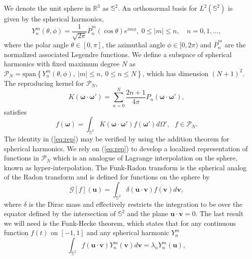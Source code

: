 \documentclass[landscape,a0b,final]{a0poster}
\newcommand{\HH}{{\mathcal P}}
\newcommand{\bomega}{{\boldsymbol{\omega}}}
\newcommand{\odotop}{{\boldsymbol{\omega}\cdot\boldsymbol{\omega}'}}
\newenvironment{poster}{
  \begin{center}
  \begin{minipage}[c]{0.98\textwidth}
}{
  \end{minipage} 
  \end{center}
}
\begin{document}
\begin{poster}
\begin{multicols}{3}
We denote the unit sphere in $\mathbb{R}^{3}$ as $\mathbb{S}^{2}$. An orthonormal basis for $L^{2}\left(\mathbb{S}^{2}\right)$ is given by the spherical harmonics, 
\begin{equation}
  Y_{n}^{m}\left(\theta,\phi\right)=\frac{1}{\sqrt{2\pi}}\overline{P}_{n}^{m}\left(\cos\theta\right)e^{im\phi},\;0\le|m|\le n,\quad n=0,1,\dots,
  \label{eq:ylm}
\end{equation}
%
where the polar angle $\theta\in[0,\pi]$, the azimuthal angle $\phi\in[0,2\pi)$
and $\overline{P}_{n}^{m}$ are the normalized associated Legendre functions. We define a subspace of spherical harmonics with fixed maximum degree $N$ as $\HH_{N}=\mathrm{span}\left\{ Y_{n}^{m}\left(\theta,\phi\right),\:|m|\le n,\:0\le n\le N\right\}$, which has dimension $\left(N+1\right)^{2}$. The reproducing kernel for $\HH_{N}$, 
%
\begin{equation}
  K\left(\bomega\cdot\bomega'\right) = \sum_{n=0}^{N}\frac{2n+1}{4\pi}P_{n}\left(\odotop\right),
  \label{eq:kernel}
\end{equation}
%
satisfies 
%
\begin{equation}
  f\left(\bomega\right)=\int_{\mathbb{S}^{2}}K\left(\odotop\right)f\left(\bomega'\right)d\Omega',\,\,\,\, f\in\HH_{N}.         
  \label{eq:rep}
\end{equation}
%
The identity in (\ref{eq:rep}) may be verified by using the addition theorem for spherical harmonics.
We rely on (\ref{eq:rep}) to develop a localized representation of functions
in $\HH_{N}$ which is an analogue of Lagrange interpolation on the sphere, known as hyper-interpolation.
%
The Funk-Radon transform is the spherical analog of the Radon transform and is defined for functions on the sphere by
%
\begin{equation}
  \mathcal{G}\left[f\right]\left(\mathbf{u}\right)=\int_{\mathbb{S}^{2}} \delta\left(\mathbf{u}\cdot\mathbf{v}\right)f\left(\mathbf{v}\right)d\mathbf{v},         
  \label{eq:funk-radon}
\end{equation}
%
where $\delta$ is the Dirac mass and effectively restricts the integration to be over the equator defined by the intersection of $\mathbb{S}^2$ and the plane $\mathbf{u}\cdot\mathbf{v} = 0$. The last result we will need is the Funk-Hecke theorem, which states that for any continuous function $f\left(t\right)$ on $\left[-1,1\right]$ and any spherical harmonic $Y_n^m$
%
\begin{equation}
  \int_{\mathbb{S}^{2}} f\left(\mathbf{u}\cdot\mathbf{v}\right)Y_n^m\left(\mathbf{v}\right)d\mathbf{v} = \lambda_n Y_n^m\left(\mathbf{u}\right),         

\end{equation}
\end{multicols}
\end{poster}
\end{document}
